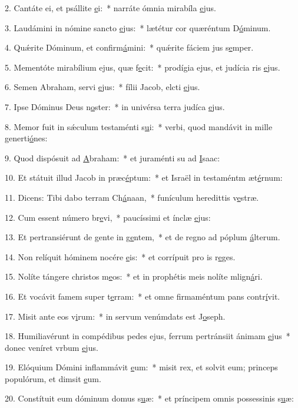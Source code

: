 2. Cantáte ei, et psállite \uline{e}i:~* narráte ómnia mirabíla \uline{e}jus.\par 
3. Laudámini in nómine sancto \uline{e}jus:~* lætétur cor quæréntum D\uline{ó}minum.\par 
4. Quǽrite Dóminum, et confirm\uline{á}mini:~* quǽrite fáciem jus s\uline{e}mper.\par 
5. Mementóte mirabílium ejus, quæ f\uline{e}cit:~* prodígia ejus, et judícia ris \uline{e}jus.\par 
6. Semen Abraham, servi \uline{e}jus:~* fílii Jacob, elcti \uline{e}jus.\par 
7. Ipse Dóminus Deus n\uline{o}ster:~* in univérsa terra judíca \uline{e}jus.\par 
8. Memor fuit in sǽculum testaménti s\uline{u}i:~* verbi, quod mandávit in mille generti\uline{ó}nes:\par 
9. Quod dispósuit ad \uline{A}braham:~* et juraménti su ad \uline{I}saac:\par 
10. Et státuit illud Jacob in præc\uline{é}ptum:~* et Israël in testaméntm æt\uline{é}rnum:\par 
11. Dicens: Tibi dabo terram Ch\uline{á}naan,~* funículum heredittis v\uline{e}stræ.\par 
12. Cum essent número br\uline{e}vi,~* paucíssimi et ínclæ \uline{e}jus:\par 
13. Et pertransiérunt de gente in g\uline{e}ntem,~* et de regno ad póplum \uline{á}lterum.\par 
14. Non relíquit hóminem nocére \uline{e}is:~* et corrípuit pro is r\uline{e}ges.\par 
15. Nolíte tángere christos m\uline{e}os:~* et in prophétis meis nolíte mlign\uline{á}ri.\par 
16. Et vocávit famem super t\uline{e}rram:~* et omne firmaméntum pans contr\uline{í}vit.\par 
17. Misit ante eos v\uline{i}rum:~* in servum venúmdats est J\uline{o}seph.\par 
18. Humiliavérunt in compédibus pedes ejus, ferrum pertránsiit ánimam \uline{e}jus~* donec veníret vrbum \uline{e}jus.\par 
19. Elóquium Dómini inflammávit \uline{e}um:~* misit rex, et solvit eum; princeps populórum, et dimsit \uline{e}um.\par 
20. Constítuit eum dóminum domus s\uline{u}æ:~* et príncipem omnis possessinis s\uline{u}æ:\par 
